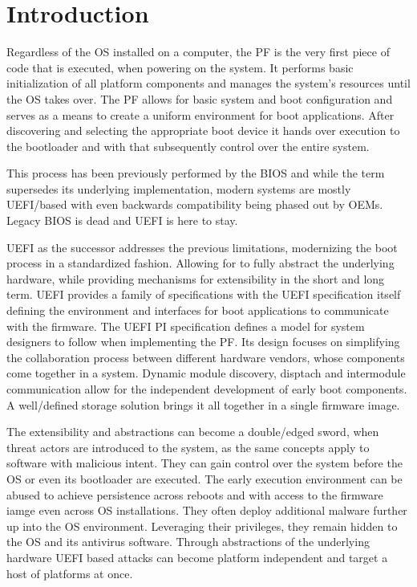 

\chapter{Introduction}


Regardless of the \ac{OS} installed on a computer, the \ac{PF} is the very first piece of code that is executed, when powering on the system.
It performs basic initialization of all platform components and manages the system's resources until the \ac{OS} takes over.
The \ac{PF} allows for basic system and boot configuration and serves as a means to create a uniform environment for boot applications.
After discovering and selecting the appropriate boot device it hands over execution to the bootloader and with that subsequently control over the entire system.

This process has been previously performed by the \ac{BIOS} and while the term supersedes its underlying implementation, modern systems are mostly \ac{UEFI}\-/based with even backwards compatibility being phased out by \acp{OEM}.
Legacy \ac{BIOS} is dead and \ac{UEFI} is here to stay.

\ac{UEFI} as the successor addresses the previous limitations, modernizing the boot process in a standardized fashion.
Allowing for to fully abstract the underlying hardware, while providing mechanisms for extensibility in the short and long term.
\ac{UEFI} provides a family of specifications with the \ac{UEFI} specification itself defining the environment and interfaces for boot applications to communicate with the firmware.
The \ac{UEFI} \ac{PI} specification defines a model for system designers to follow when implementing the \ac{PF}.
Its design focuses on simplifying the collaboration process between different hardware vendors, whose components come together in a system.
Dynamic module discovery, disptach and intermodule communication allow for the independent development of early boot components.
A well\-/defined storage solution brings it all together in a single firmware image.

The extensibility and abstractions can become a double\-/edged sword, when threat actors are introduced to the system, as the same concepts apply to software with malicious intent.
They can gain control over the system before the \ac{OS} or even its bootloader are executed.
The early execution environment can be abused to achieve persistence across reboots and with access to the firmware iamge even across \ac{OS} installations.
They often deploy additional malware further up into the \ac{OS} environment.
Leveraging their privileges, they remain hidden to the \ac{OS} and its antivirus software.
Through abstractions of the underlying hardware \ac{UEFI} based attacks can become platform independent and target a host of platforms at once.


